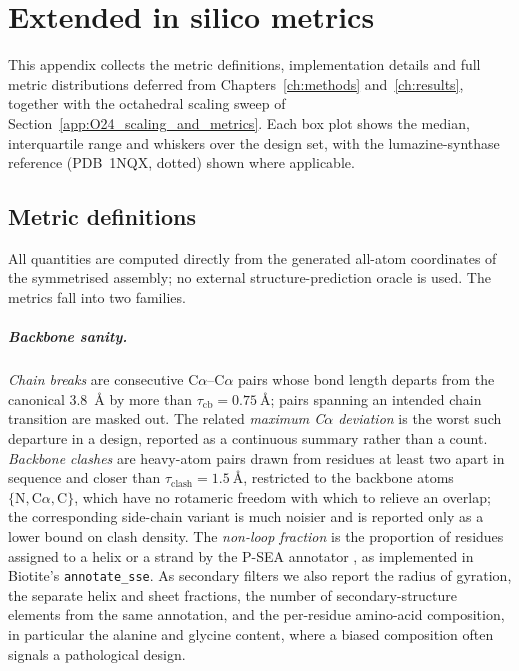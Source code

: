 \chapter{Extended in silico metrics}
\label{app:extended}

This appendix collects the metric definitions, implementation details and full
metric distributions deferred from Chapters~\ref{ch:methods}
and~\ref{ch:results}, together with the octahedral scaling sweep of
Section~\ref{app:O24_scaling_and_metrics}. Each box plot shows the median,
interquartile range and whiskers over the design set, with the
lumazine-synthase reference (PDB~1NQX, dotted) shown where applicable.

\section{Metric definitions}
\label{app:metric-defs}
\label{app:designability}%

All quantities are computed directly from the generated all-atom coordinates of
the symmetrised assembly; no external structure-prediction oracle is used. The
metrics fall into two families.

\paragraph{Backbone sanity.}
\emph{Chain breaks} are consecutive C$\alpha$--C$\alpha$ pairs whose bond length
departs from the canonical \SI{3.8}{\angstrom} by more than
$\tau_\text{cb}=\SI{0.75}{\angstrom}$; pairs spanning an intended chain
transition are masked out. The related \emph{maximum C$\alpha$ deviation} is the
worst such departure in a design, reported as a continuous summary rather than a
count. \emph{Backbone clashes} are heavy-atom pairs drawn from residues at least
two apart in sequence and closer than $\tau_\text{clash}=\SI{1.5}{\angstrom}$,
restricted to the backbone atoms $\{\text{N},\text{C}\alpha,\text{C}\}$, which
have no rotameric freedom with which to relieve an overlap; the corresponding
side-chain variant is much noisier and is reported only as a lower bound on
clash density. The \emph{non-loop fraction} is the proportion of residues
assigned to a helix or a strand by the P-SEA annotator
\parencite{labesse_p-sea_1997}, as implemented in Biotite's
\texttt{annotate\_sse}. As secondary filters we also report the radius of
gyration, the separate helix and sheet fractions, the number of
secondary-structure elements from the same annotation, and the per-residue
amino-acid composition, in particular the alanine and glycine content, where a
biased composition often signals a pathological design.

